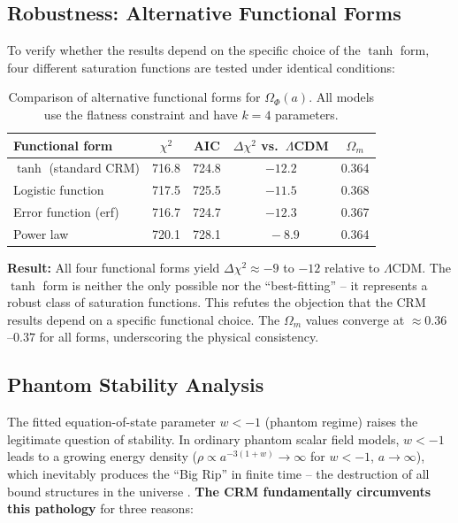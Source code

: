 \documentclass[aps,prd,twocolumn,superscriptaddress,nofootinbib]{revtex4-2}
\begin{document}
\subsection{Robustness: Alternative Functional Forms}
\label{subsec:funcforms}

To verify whether the results depend on the specific choice of the $\tanh$ form, four different saturation functions are tested under identical conditions:

\begin{table}[htbp]
\centering
\caption{Comparison of alternative functional forms for $\Omega_\Phi(a)$. All models use the flatness constraint and have $k=4$ parameters.}
\label{tab:funcforms}
\begin{tabular}{lcccc}
\toprule
\textbf{Functional form} & $\chi^2$ & AIC & $\Delta\chi^2$ vs.\ $\Lambda$CDM & $\Omega_m$ \\
\midrule
$\tanh$ (standard CRM) & 716.8 & 724.8 & $-12.2$ & 0.364 \\
Logistic function & 717.5 & 725.5 & $-11.5$ & 0.368 \\
Error function (erf) & 716.7 & 724.7 & $-12.3$ & 0.367 \\
Power law & 720.1 & 728.1 & $\phantom{0}-8.9$ & 0.364 \\
\bottomrule
\end{tabular}
\end{table}

\textbf{Result:} All four functional forms yield $\Delta\chi^2 \approx -9$ to $-12$ relative to $\Lambda$CDM. The $\tanh$ form is neither the only possible nor the ``best-fitting'' -- it represents a robust class of saturation functions. This refutes the objection that the CRM results depend on a specific functional choice. The $\Omega_m$ values converge at $\approx 0.36$--$0.37$ for all forms, underscoring the physical consistency.


\subsection{Phantom Stability Analysis}
\label{subsec:phantom}

The fitted equation-of-state parameter $w < -1$ (phantom regime) raises the legitimate question of stability. In ordinary phantom scalar field models, $w < -1$ leads to a growing energy density ($\rho \propto a^{-3(1+w)} \to \infty$ for $w < -1$, $a \to \infty$), which inevitably produces the ``Big Rip'' in finite time -- the destruction of all bound structures in the universe \cite{Caldwell1998}. \textbf{The CRM fundamentally circumvents this pathology} for three reasons:
\end{document}
